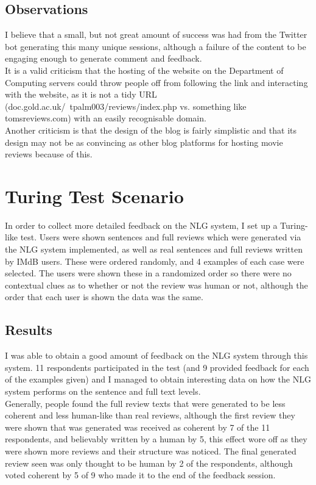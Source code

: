 \subsection{Observations}
I believe that a small, but not great amount of success was had from the Twitter bot generating this many unique sessions, although a failure of the content to be engaging enough to generate comment and feedback.\\
It is a valid criticism that the hosting of the website on the Department of Computing servers could throw people off from following the link and interacting with the website, as it is not a tidy URL (doc.gold.ac.uk/~tpalm003/reviews/index.php vs. something like tomsreviews.com) with an easily recognisable domain.\\
Another criticism is that the design of the blog is fairly simplistic and that its design may not be as convincing as other blog platforms for hosting movie reviews because of this.\\


\section{Turing Test Scenario}
In order to collect more detailed feedback on the NLG system, I set up a Turing-like test. Users were shown sentences and full reviews which were generated via the NLG system implemented, as well as real sentences and full reviews written by IMdB users. These were ordered randomly, and 4 examples of each case were selected. The users were shown these in a randomized order so there were no contextual clues as to whether or not the review was human or not, although the order that each user is shown the data was the same.

\subsection{Results}
I was able to obtain a good amount of feedback on the NLG system through this system. 11 respondents participated in the test (and 9 provided feedback for each of the examples given) and I managed to obtain interesting data on how the NLG system performs on the sentence and full text levels.\\
Generally, people found the full review texts that were generated to be less coherent and less human-like than real reviews, although the first review they were shown that was generated was received as coherent by 7 of the 11 respondents, and believably written by a human by 5, this effect wore off as they were shown more reviews and their structure was noticed. The final generated review seen was only thought to be human by 2 of the respondents, although voted coherent by 5 of 9 who made it to the end of the feedback session. \\

